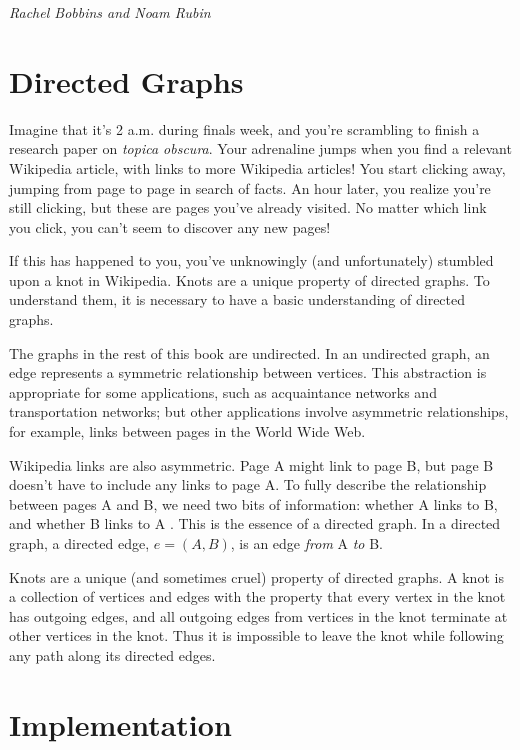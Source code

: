 \documentclass[10pt]{book}
\begin{document}
{\em Rachel Bobbins and Noam Rubin}

\section{Directed Graphs}

Imagine that it's 2 a.m. during finals week, and you're scrambling to
finish a research paper on \emph{topica obscura}. Your adrenaline
jumps when you find a relevant Wikipedia article, with links
to more Wikipedia articles! You start clicking away, jumping from page
to page in search of facts. An hour later, you realize you're still
clicking, but these are pages you've already visited. No matter which
link you click, you can't seem to discover any new pages!

If this has happened to you, you've unknowingly
(and unfortunately) stumbled upon a knot in Wikipedia. Knots are a
unique property of directed graphs. To understand them, it is necessary
to have a basic understanding of directed graphs.
	 	 	
The graphs in the rest of this book are undirected. In an
undirected graph, an edge represents a symmetric relationship between
vertices. This abstraction is appropriate for some applications,
such as acquaintance networks and transportation networks; but other
applications involve asymmetric relationships, for example, links
between pages in the World Wide Web.

Wikipedia links are also asymmetric. Page A might link to page B, but
page B doesn't have to include any links to page A. To fully describe
the relationship between pages A and B, we need two bits of
information: whether A links to B, and whether B links to A . This is
the essence of a directed graph. In a directed graph, a directed
edge, $e = (A,B)$, is an edge {\em from} A \emph{to} B.


Knots are a unique (and sometimes cruel)
property of directed graphs. A knot is a
collection of vertices and edges with the property that every vertex
in the knot has outgoing edges, and all outgoing edges from vertices
in the knot terminate at other vertices in the knot. Thus it is
impossible to leave the knot while following any path along its
directed edges.

\section{Implementation}
\end{document}
